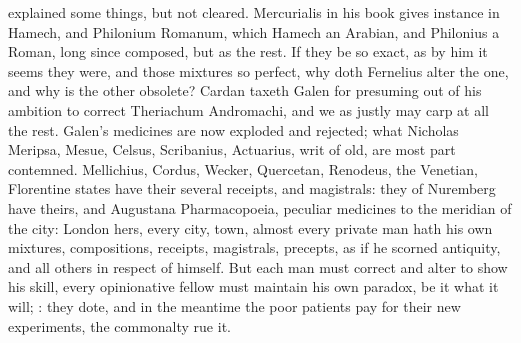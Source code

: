 {explained some things, but not cleared. Mercurialis in his book  gives instance in Hamech, and Philonium Romanum, which Hamech an Arabian, and Philonius a Roman, long since composed, but  as the rest. If they be so exact, as by him it seems they were, and those mixtures so perfect, why doth Fernelius alter the one, and why is the other obsolete? Cardan taxeth Galen for presuming out of his ambition to correct Theriachum Andromachi, and we as justly may carp at all the rest. Galen's medicines are now exploded and rejected; what Nicholas Meripsa, Mesue, Celsus, Scribanius, Actuarius, \etc{} writ of old, are most part contemned. Mellichius, Cordus, Wecker, Quercetan, Renodeus, the Venetian, Florentine states have their several receipts, and magistrals: they of Nuremberg have theirs, and Augustana Pharmacopoeia, peculiar medicines to the meridian of the city: London hers, every city, town, almost every private man hath his own mixtures, compositions, receipts, magistrals, precepts, as if he scorned antiquity, and all others in respect of himself. But each man must correct and alter to show his skill, every opinionative fellow must maintain his own paradox, be it what it will; : they dote, and in the meantime the poor patients pay for their new experiments, the commonalty rue it.

}
